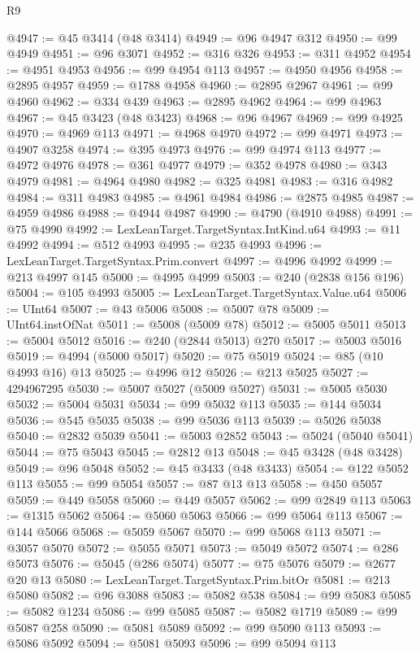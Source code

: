 \begin{lexlean}{R9}
\begin{coremodule}
{{{{{{{{{{{{{{{{{{{{{{{{{{{{{{{{{{{{{{{{{{{{{{{{{{{{{{{{{{{{{{{{{{{{{{{{{{{{{{{{{{{{@4947 := @45 @3414 (@48 @3414)
@4949 := @96 @4947 @312
@4950 := @99 @4949
@4951 := @96 @3071
@4952 := @316 @326
@4953 := @311 @4952
@4954 := @4951 @4953
@4956 := @99 @4954 @113
@4957 := @4950 @4956
@4958 := @2895 @4957
@4959 := @1788 @4958
@4960 := @2895 @2967
@4961 := @99 @4960
@4962 := @334 @439
@4963 := @2895 @4962
@4964 := @99 @4963
@4967 := @45 @3423 (@48 @3423)
@4968 := @96 @4967
@4969 := @99 @4925
@4970 := @4969 @113
@4971 := @4968 @4970
@4972 := @99 @4971
@4973 := @4907 @3258
@4974 := @395 @4973
@4976 := @99 @4974 @113
@4977 := @4972 @4976
@4978 := @361 @4977
@4979 := @352 @4978
@4980 := @343 @4979
@4981 := @4964 @4980
@4982 := @325 @4981
@4983 := @316 @4982
@4984 := @311 @4983
@4985 := @4961 @4984
@4986 := @2875 @4985
@4987 := @4959 @4986
@4988 := @4944 @4987
@4990 := @4790 (@4910 @4988)
@4991 := @75 @4990
@4992 := LexLeanTarget.TargetSyntax.IntKind.u64
@4993 := @11 @4992
@4994 := @512 @4993
@4995 := @235 @4993
@4996 := LexLeanTarget.TargetSyntax.Prim.convert
@4997 := @4996 @4992
@4999 := @213 @4997 @145
@5000 := @4995 @4999
@5003 := @240 (@2838 @156 @196)
@5004 := @105 @4993
@5005 := LexLeanTarget.TargetSyntax.Value.u64
@5006 := UInt64
@5007 := @43 @5006
@5008 := @5007 @78
@5009 := UInt64.instOfNat
@5011 := @5008 (@5009 @78)
@5012 := @5005 @5011
@5013 := @5004 @5012
@5016 := @240 (@2844 @5013) @270
@5017 := @5003 @5016
@5019 := @4994 (@5000 @5017)
@5020 := @75 @5019
@5024 := @85 (@10 @4993 @16) @13
@5025 := @4996 @12
@5026 := @213 @5025
@5027 := 4294967295
@5030 := @5007 @5027 (@5009 @5027)
@5031 := @5005 @5030
@5032 := @5004 @5031
@5034 := @99 @5032 @113
@5035 := @144 @5034
@5036 := @545 @5035
@5038 := @99 @5036 @113
@5039 := @5026 @5038
@5040 := @2832 @5039
@5041 := @5003 @2852
@5043 := @5024 (@5040 @5041)
@5044 := @75 @5043
@5045 := @2812 @13
@5048 := @45 @3428 (@48 @3428)
@5049 := @96 @5048
@5052 := @45 @3433 (@48 @3433)
@5054 := @122 @5052 @113
@5055 := @99 @5054
@5057 := @87 @13 @13
@5058 := @450 @5057
@5059 := @449 @5058
@5060 := @449 @5057
@5062 := @99 @2849 @113
@5063 := @1315 @5062
@5064 := @5060 @5063
@5066 := @99 @5064 @113
@5067 := @144 @5066
@5068 := @5059 @5067
@5070 := @99 @5068 @113
@5071 := @3057 @5070
@5072 := @5055 @5071
@5073 := @5049 @5072
@5074 := @286 @5073
@5076 := @5045 (@286 @5074)
@5077 := @75 @5076
@5079 := @2677 @20 @13
@5080 := LexLeanTarget.TargetSyntax.Prim.bitOr
@5081 := @213 @5080
@5082 := @96 @3088
@5083 := @5082 @538
@5084 := @99 @5083
@5085 := @5082 @1234
@5086 := @99 @5085
@5087 := @5082 @1719
@5089 := @99 @5087 @258
@5090 := @5081 @5089
@5092 := @99 @5090 @113
@5093 := @5086 @5092
@5094 := @5081 @5093
@5096 := @99 @5094 @113
}}}}}}}}}}}}}}}}}}}}}}}}}}}}}}}}}}}}}}}}}}}}}}}}}}}}}}}}}}}}}}}}}}}}}}}}}}}}}}}}}}}}
\end{coremodule}
\end{lexlean}
